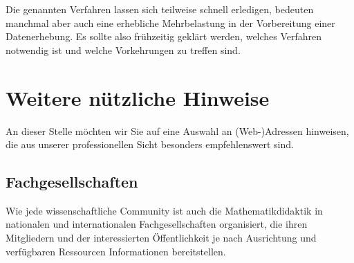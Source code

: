 \documentclass[ngerman,bibliography=totoc,oneside,12pt,a4paper]{scrbook}
\begin{document}
Die genannten Verfahren lassen sich teilweise schnell erledigen,
bedeuten manchmal aber auch eine erhebliche Mehrbelastung in der
Vorbereitung einer Datenerhebung. Es sollte also frühzeitig geklärt
werden, welches Verfahren notwendig ist und welche Vorkehrungen zu
treffen sind.

\chapter{Weitere nützliche Hinweise}\label{weitere-nutzliche-hinweise}

An dieser Stelle möchten wir Sie auf eine Auswahl an (Web-)Adressen
hinweisen, die aus unserer professionellen Sicht besonders
empfehlenswert sind.

\section{Fachgesellschaften}\label{fachgesellschaften}

Wie jede wissenschaftliche Community ist auch die Mathematikdidaktik in
nationalen und internationalen Fachgesellschaften organisiert, die ihren
Mitgliedern und der interessierten Öffentlichkeit je nach Ausrichtung
und verfügbaren Ressourcen Informationen bereitstellen.
\end{document}
